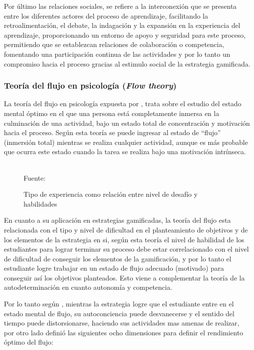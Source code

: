 Por último las relaciones sociales, se refiere a la interconexión que se presenta entre los diferentes actores 
del proceso de aprendizaje, facilitando la retroalimentación, el debate, la indagación y la expansión en la 
experiencia del aprendizaje, proporcionando un entorno de apoyo y seguridad para este proceso, permitiendo que 
se establezcan relaciones de colaboración o competencia, fomentando una participación continua de las 
actividades y por lo tanto un compromiso hacia el proceso gracias al estimulo social de la estrategia 
gamificada.

\subsubsection{Teoría del flujo en psicología (\textit{Flow theory})}

La teoría del flujo en psicología expuesta por , trata sobre el estudio del estado 
mental óptimo en el que una persona está completamente inmersa en la culminación de una actividad, bajo un
estado total de concentración y motivación hacia el proceso. Según esta teoría se puede ingresar al estado de 
``flujo'' (inmersión total) mientras se realiza cualquier actividad, aunque es más probable que ocurra este
estado cuando la tarea se realiza bajo una motivación intrínseca.

\begin{figure}[ht]
\caption{Tipo de experiencia como relación entre nivel de desafío y habilidades}
\label{img:tflow}
\centering

\\
{\footnotesize Fuente: \citeA<basada en>{csikszentmihalyi_1988}}
\end{figure}

En cuanto a su aplicación en estrategias gamificadas, la teoría del flujo esta relacionada con el tipo y nivel 
de dificultad en el planteamiento de objetivos y de los elementos de la estrategia en si, según esta teoría el 
nivel de habilidad de los estudiantes para lograr terminar su proceso debe estar correlacionado con el nivel 
de dificultad de conseguir los elementos de la gamificación, y por lo tanto el estudiante logre trabajar en un 
estado de flujo adecuado (motivado) para conseguir así los objetivos planteados. Esto viene a complementar la 
teoría de la autodeterminación en cuanto autonomía y competencia.

Por lo tanto según , mientras la estrategia logre que el estudiante entre en el estado 
mental de flujo, su autoconciencia puede desvanecerse y el sentido del tiempo puede distorsionarse, haciendo 
sus actividades mas amenas de realizar, por otro lado  definió las siguientes 
ocho dimensiones para definir el rendimiento óptimo del flujo:

